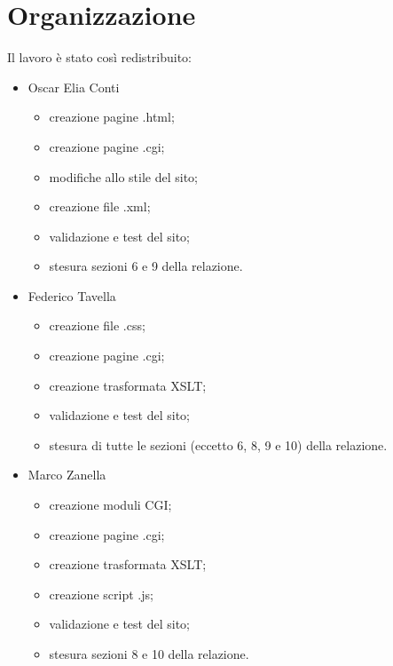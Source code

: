 \documentclass[../Relazione.tex]{subfiles}
\begin{document}
\section{Organizzazione}
Il lavoro è stato così redistribuito:
\begin{itemize}
\item Oscar Elia Conti
\begin{itemize}
\item creazione pagine .html;
\item creazione pagine .cgi;
\item modifiche allo stile del sito;
\item creazione file .xml;
\item validazione e test del sito;
\item stesura sezioni 6 e 9 della relazione.
\end{itemize}
\item Federico Tavella
\begin{itemize}
\item creazione file .css;
\item creazione pagine .cgi;
\item creazione trasformata XSLT;
\item validazione e test del sito;
\item stesura di tutte le sezioni (eccetto 6, 8, 9 e 10) della relazione.
\end{itemize}
\item Marco Zanella
\begin{itemize}
\item creazione moduli CGI;
\item creazione pagine .cgi;
\item creazione trasformata XSLT;
\item creazione script .js;
\item validazione e test del sito;
\item stesura sezioni 8 e 10 della relazione.
\end{itemize}
\end{itemize}

			
\end{document}
